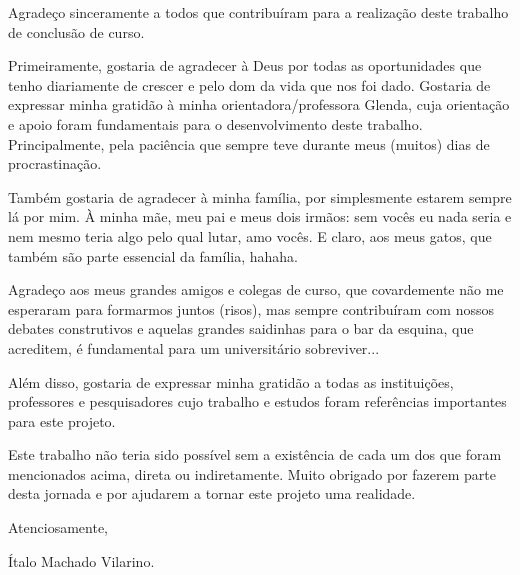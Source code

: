 \documentclass[tcc2]{uftex}
\begin{document}
  \begin{acknowledgement}
Agradeço sinceramente a todos que contribuíram para a realização deste trabalho de conclusão de curso.

Primeiramente, gostaria de agradecer à Deus por todas as oportunidades que tenho diariamente de crescer e pelo dom da vida que nos foi dado. Gostaria de expressar minha gratidão à minha orientadora/professora Glenda, cuja orientação e apoio foram fundamentais para o desenvolvimento deste trabalho. Principalmente, pela paciência que sempre teve durante meus (muitos) dias de procrastinação.

Também gostaria de agradecer à minha família, por simplesmente estarem sempre lá por mim. À minha mãe, meu pai e meus dois irmãos: sem vocês eu nada seria e nem mesmo teria algo pelo qual lutar, amo vocês. E claro, aos meus gatos, que também são parte essencial da família, hahaha.

Agradeço aos meus grandes amigos e colegas de curso, que covardemente não me esperaram para formarmos juntos (risos), mas sempre contribuíram com nossos debates construtivos e aquelas grandes saidinhas para o bar da esquina, que acreditem, é fundamental para um universitário sobreviver...

Além disso, gostaria de expressar minha gratidão a todas as instituições, professores e pesquisadores cujo trabalho e estudos foram referências importantes para este projeto.

Este trabalho não teria sido possível sem a existência de cada um dos que foram mencionados acima, direta ou indiretamente. Muito obrigado por fazerem parte desta jornada e por ajudarem a tornar este projeto uma realidade.

Atenciosamente,

Ítalo Machado Vilarino.
  \end{acknowledgement}
\end{document}
